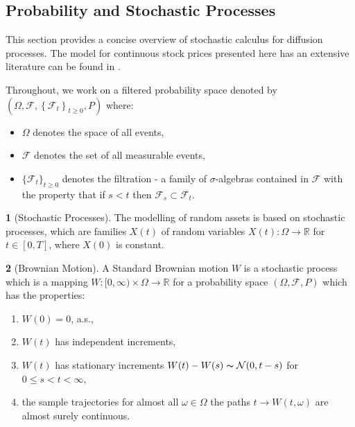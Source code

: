 \documentclass[british]{amsart} \usepackage{lmodern}
\numberwithin{equation}{section} \numberwithin{figure}{section}
\theoremstyle{plain} \newtheorem{thm}{\protect\theoremname}[section]
\theoremstyle{definition} \newtheorem{defn}[thm]{\protect\definitionname}
\theoremstyle{plain} \newtheorem{assumption}[thm]{\protect\assumptionname}
\theoremstyle{plain} \newtheorem{lem}[thm]{\protect\lemmaname}
\theoremstyle{plain} \newtheorem{prop}[thm]{\protect\propositionname}
\theoremstyle{remark} \newtheorem{rem}[thm]{\protect\remarkname}
\theoremstyle{plain} \newtheorem{cor}[thm]{\protect\corollaryname}
\begin{document}

\subsection{Probability and Stochastic Processes}

This section provides a concise overview of stochastic calculus for
diffusion processes. The model for continuous stock prices presented
here has an extensive literature can be found in \cite{shreve1991}.

Throughout, we work on a filtered probability space denoted
by $(\Omega,\mathcal{F},\left\{ \mathcal{F}_{t}\right\} _{t\ge0},P)$
where:

\begin{itemize}
  \item $\Omega$ denotes the space of all events,
  \item $\mathcal{F}$ denotes the set of all measurable events,
  \item $\{ \mathcal{F}_{t}\}_{t\ge0}$ denotes the filtration
        - a family of $\sigma$-algebras contained in $\mathcal{F}$ with
        the property that if $s<t$ then $\mathcal{F}_{s}\subset\mathcal{F}_{t}$. 
\end{itemize}

\begin{defn} [Stochastic Processes]
  The modelling of random assets is based on stochastic processes, which are
  families $X(t)$  of random variables $X(t):\Omega\to\mathbb{R}$ for $t\in[0,T]$,
  where $X(0)$ is constant.
\end{defn}

\begin{defn} [Brownian Motion]
  A Standard Brownian motion $W$ is a stochastic process which
  is a mapping $W:[0,\infty)\times\Omega\to\mathbb{R}$ for a probability
  space $(\Omega,\mathcal{F},P)$ which has the properties:

  \begin{enumerate}
    \item $W(0)=0$, a.s.,
    \item $W(t)$ has independent increments,
    \item $W(t)$ has stationary increments $W(t)-W(s)\thicksim\mathcal{N}(0,t-s)$
          for $0\le s<t<\infty,$
    \item the sample trajectories for almost all $\omega\in\Omega$ the paths
          $t\to W(t,\omega)$ are almost surely continuous.
  \end{enumerate}
\end{defn}
\end{document}
